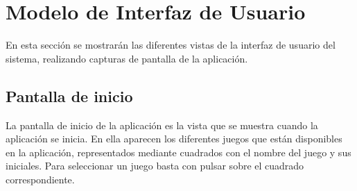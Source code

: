 
\section{Modelo de Interfaz de Usuario}
En esta sección se mostrarán las diferentes vistas de la interfaz de usuario del sistema, realizando capturas de 
pantalla de la aplicación.

\subsection{Pantalla de inicio}
La pantalla de inicio de la aplicación es la vista que se muestra cuando la aplicación se inicia. En ella aparecen los diferentes 
juegos que están disponibles en la aplicación, representados mediante cuadrados con el nombre del juego y sus iniciales.
Para seleccionar un juego basta con pulsar sobre el cuadrado correspondiente.



